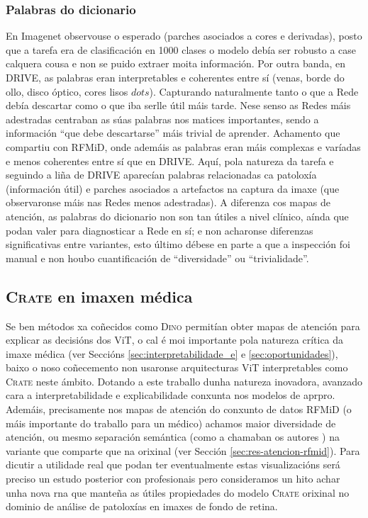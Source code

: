 \subsubsection{Palabras do dicionario}

En Imagenet observouse o esperado (parches asociados a cores e derivadas), posto que a tarefa era de clasificación en 1000 clases o modelo debía ser robusto a case calquera cousa e non se puido extraer moita información. Por outra banda, en DRIVE, as palabras eran interpretables e coherentes entre sí (venas, borde do ollo, disco óptico, cores lisos $dots$). Capturando naturalmente tanto o que a Rede debía descartar como o que iba serlle útil máis tarde. Nese senso as Redes máis adestradas centraban as súas palabras nos matices importantes, sendo a información ``que debe descartarse'' máis trivial de aprender. Achamento que compartiu con RFMiD, onde ademáis as palabras eran máis complexas e varíadas e menos coherentes entre sí que en DRIVE. Aquí, pola natureza da tarefa e seguindo a liña de DRIVE aparecían palabras relacionadas ca patoloxía (información útil) e parches asociados a artefactos na captura da imaxe (que observaronse máis nas Redes menos adestradas). A diferenza cos mapas de atención, as palabras do dicionario non son tan útiles a nivel clínico, aínda que podan valer para diagnosticar a Rede en sí; e non acharonse diferenzas significativas entre variantes, esto último débese en parte a que a inspección foi manual e non houbo cuantificación de ``diversidade'' ou ``trivialidade''.

\subsection{\textsc{Crate} en imaxen médica}

Se ben métodos xa coñecidos como \textsc{Dino} \cite{dino} permitían obter mapas de atención para explicar as decisións dos ViT, o cal é moi importante pola natureza crítica da imaxe médica (ver Seccións \ref{sec:interpretabilidade_e} e \ref{sec:oportunidades}), baixo o noso coñecemento non usaronse arquitecturas ViT interpretables como \textsc{Crate} neste ámbito. Dotando a este traballo dunha natureza inovadora, avanzado cara a \gls{interpretabilidade} e \gls{explicabilidade} conxunta nos modelos de \acrshort{aprpro}. Ademáis, precisamente nos mapas de atención do conxunto de datos RFMiD (o máis importante do traballo para un médico) achamos maior diversidade de atención, ou mesmo separación semántica (como a chamaban os autores \cite{crate,emergenciaSegmentacion}) na variante que comparte que na orixinal (ver Sección \ref{sec:res-atencion-rfmid}). Para dicutir a utilidade real que podan ter eventualmente estas visualizacións será preciso un estudo posterior con profesionais pero consideramos un hito achar unha nova \acrshort{rna} que manteña as útiles propiedades do modelo \textsc{Crate} orixinal no dominio de análise de patoloxías en imaxes de fondo de retina.


